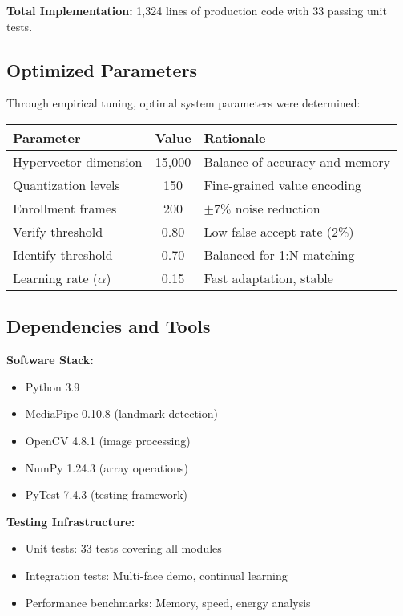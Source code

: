 \documentclass[a4paper,12pt]{article}
\begin{document}
\textbf{Total Implementation:} 1,324 lines of production code with 33 passing unit tests.

\subsection{Optimized Parameters}

Through empirical tuning, optimal system parameters were determined:

\begin{center}
\begin{tabular}{|l|c|l|}
\hline
\textbf{Parameter} & \textbf{Value} & \textbf{Rationale} \\
\hline
Hypervector dimension & 15,000 & Balance of accuracy and memory \\
Quantization levels & 150 & Fine-grained value encoding \\
Enrollment frames & 200 & $\pm7\%$ noise reduction \\
Verify threshold & 0.80 & Low false accept rate (2\%) \\
Identify threshold & 0.70 & Balanced for 1:N matching \\
Learning rate ($\alpha$) & 0.15 & Fast adaptation, stable \\
\hline
\end{tabular}
\end{center}

\subsection{Dependencies and Tools}

\textbf{Software Stack:}
\begin{itemize}
    \item Python 3.9
    \item MediaPipe 0.10.8 (landmark detection)
    \item OpenCV 4.8.1 (image processing)
    \item NumPy 1.24.3 (array operations)
    \item PyTest 7.4.3 (testing framework)
\end{itemize}

\textbf{Testing Infrastructure:}
\begin{itemize}
    \item Unit tests: 33 tests covering all modules
    \item Integration tests: Multi-face demo, continual learning
    \item Performance benchmarks: Memory, speed, energy analysis
\end{itemize}
\end{document}
